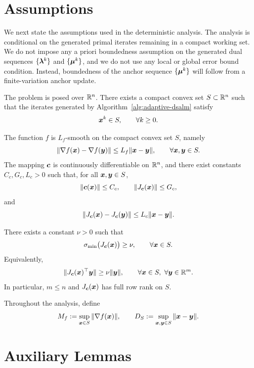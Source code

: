 \documentclass[10pt]{article}
\begin{document}
\section{Assumptions}
\label{sec:assumptions}

We next state the assumptions used in the deterministic analysis.  The
analysis is conditional on the generated primal iterates remaining in a
compact working set.  We do not impose any a priori boundedness assumption
on the generated dual sequences $\{\bm{\lambda}^k\}$ and $\{\bm{\mu}^k\}$, and we do
not use any local or global error bound condition.  Instead, boundedness of
the anchor sequence $\{\bm{\mu}^k\}$ will follow from a finite-variation anchor
update.

\begin{assumption}
\label{ass:working-set}
The problem is posed over $\mathbb{R}^n$.  There exists a compact convex set
$S\subset\mathbb{R}^n$ such that the iterates generated by
Algorithm~\ref{alg:adaptive-dsalm} satisfy
\[
    \bm{x}^k\in S,
    \qquad \forall k\ge 0.
\]
\end{assumption}

\begin{assumption}
\label{ass:smoothness}
The function $f$ is $L_f$-smooth on the compact convex set $S$, namely
\[
    \|\nabla f(\bm{x})-\nabla f(\bm{y})\|
    \le
    L_f\|\bm{x}-\bm{y}\|,
    \qquad \forall \bm{x},\bm{y}\in S.
\]
The mapping $\bm{c}$ is continuously differentiable on $\mathbb{R}^n$, and there exist
constants $C_c,G_c,L_c>0$ such that, for all $\bm{x},\bm{y}\in S$,
\[
    \|\bm{c}(\bm{x})\|\le C_c,
    \qquad
    \|J_{\bm{c}}(\bm{x})\|\le G_c,
\]
and
\[
    \|J_{\bm{c}}(\bm{x})-J_{\bm{c}}(\bm{y})\|
    \le
    L_c\|\bm{x}-\bm{y}\|.
\]
\end{assumption}

\begin{assumption}
\label{ass:strong-licq}
There exists a constant $\nu>0$ such that
\[
    \sigma_{\min}\bigl(J_{\bm{c}}(\bm{x})\bigr)\ge \nu,
    \qquad
    \forall \bm{x}\in S.
\]
Equivalently,
\[
    \|J_{\bm{c}}(\bm{x})^\top \bm{y}\|
    \ge
    \nu \|\bm{y}\|,
    \qquad \forall \bm{x}\in S,\ \forall \bm{y}\in\mathbb{R}^m.
\]
In particular, $m\le n$ and $J_{\bm{c}}(\bm{x})$ has full row rank on $S$.
\end{assumption}

Throughout the analysis, define
\[
    M_f:=\sup_{\bm{x}\in S}\|\nabla f(\bm{x})\|,
    \qquad
    D_S:=\sup_{\bm{x},\bm{y}\in S}\|\bm{x}-\bm{y}\|.
\]

\section{Auxiliary Lemmas}
\label{sec:basic-descent}
\end{document}
